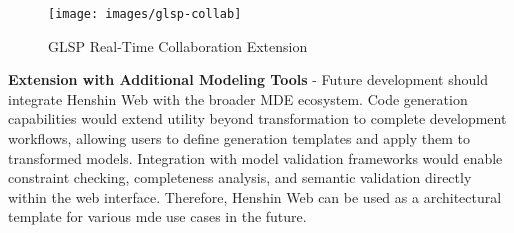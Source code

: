   \begin{figure}
    \centering
    \texttt{[image: images/glsp-collab]}
    \caption{GLSP Real-Time Collaboration Extension \cite{glsp-collab}}
    \label{fig:glsp-collaboration}
  \end{figure}

  \textbf{Extension with Additional Modeling Tools} - Future development should integrate Henshin Web with the broader MDE ecosystem. Code generation capabilities would extend utility beyond transformation to complete development workflows, allowing users to define generation templates and apply them to transformed models. Integration with model validation frameworks would enable constraint checking, completeness analysis, and semantic validation directly within the web interface. Therefore, Henshin Web can be used as a architectural template for various \ac{mde} use cases in the future.